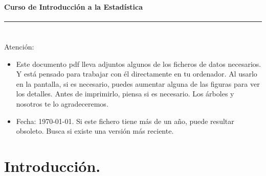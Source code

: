 \documentclass[10pt,a4paper]{article}\usepackage[]{graphicx}\usepackage[]{color}
\newcounter {cont01}
\begin{document}


\paragraph{\hspace{6.3cm}Curso de Introducción a la Estadística\\[2mm]} \noindent\hrule

\setcounter{section}{0}
\section*{\hspace{-0.1cm}} Atención:
\begin{itemize}
  \item Este documento pdf lleva adjuntos algunos de los ficheros de datos necesarios. Y está
      pensado para trabajar con él directamente en tu ordenador. Al usarlo en la pantalla, si es
      necesario, puedes aumentar alguna de las figuras para ver los detalles. Antes de
      imprimirlo, piensa si es necesario. Los árboles y nosotros te lo agradeceremos.
  \item Fecha: \today. Si este fichero tiene más de un año, puede resultar obsoleto. Busca si
      existe una versión más reciente.
\end{itemize}
\setcounter{tocdepth}{1}
\tableofcontents

\section*{Introducción.}
\end{document}
